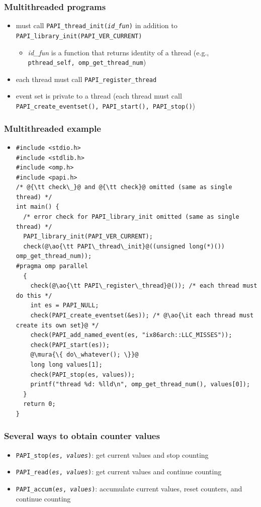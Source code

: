 \documentclass[12pt,dvipdfmx]{beamer}
\newcommand{\mura}[1]{{\color{purple}#1}}
\newcommand{\ao}[1]{{\color{blue}#1}}
\begin{document}
\begin{frame}
\frametitle{Multithreaded programs}
\begin{itemize}
\item must call \ao{\tt PAPI\_thread\_init({\it id\_fun})} in addition to
  {\tt PAPI\_library\_init(PAPI\_VER\_CURRENT)}
  \begin{itemize}
  \item {\it id\_fun} is a function that returns identity of a thread
    (e.g., {\tt pthread\_self, omp\_get\_thread\_num})
  \end{itemize}
\item each thread must call \ao{\tt PAPI\_register\_thread}
\item event set is private to a thread (each thread must call
  \ao{\tt PAPI\_create\_eventset(), PAPI\_start(), PAPI\_stop()})
\end{itemize}
\end{frame}

\begin{frame}[fragile]
\frametitle{Multithreaded example}
\begin{itemize}
\item []
\begin{lstlisting}
#include <stdio.h>
#include <stdlib.h>
#include <omp.h>
#include <papi.h>
/* @{\tt check\_}@ and @{\tt check}@ omitted (same as single thread) */
int main() {
  /* error check for PAPI_library_init omitted (same as single thread) */
  PAPI_library_init(PAPI_VER_CURRENT);
  check(@\ao{\tt PAPI\_thread\_init}@((unsigned long(*)()) omp_get_thread_num));
#pragma omp parallel
  {
    check(@\ao{\tt PAPI\_register\_thread}@()); /* each thread must do this */
    int es = PAPI_NULL;
    check(PAPI_create_eventset(&es)); /* @\ao{\it each thread must create its own set}@ */
    check(PAPI_add_named_event(es, "ix86arch::LLC_MISSES"));
    check(PAPI_start(es));
    @\mura{\{ do\_whatever(); \}}@
    long long values[1];
    check(PAPI_stop(es, values));
    printf("thread %d: %lld\n", omp_get_thread_num(), values[0]);
  }
  return 0;
}
\end{lstlisting}
\end{itemize}
\end{frame}

\begin{frame}
\frametitle{Several ways to obtain counter values}
\begin{itemize}
\item \ao{\tt PAPI\_stop({\it es}, {\it values})}: get current values and stop counting
\item \ao{\tt PAPI\_read({\it es}, {\it values})}: get current values and continue counting
\item \ao{\tt PAPI\_accum({\it es}, {\it values})}: accumulate current values, 
  reset counters, and continue counting
\end{itemize}
\end{frame}
\end{document}
